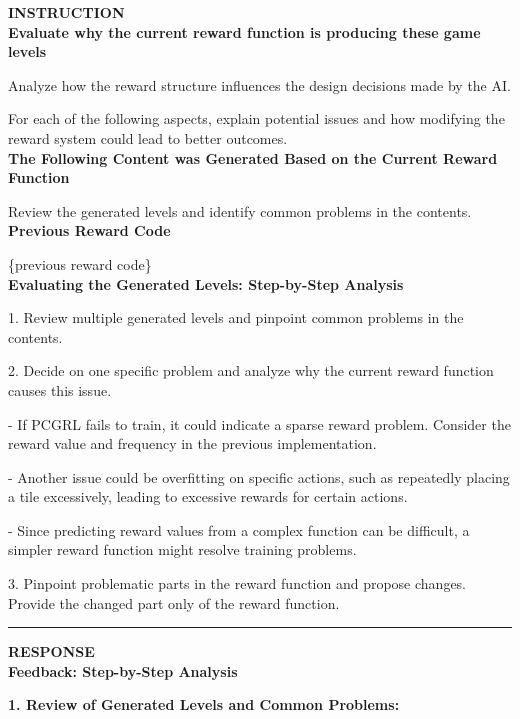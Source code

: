 \begin{tcolorbox}[colback=white, colframe=gray, title=Feedback, breakable]
{\textbf{\MakeUppercase{Instruction}}}  \\

\textbf{Evaluate why the current reward function is producing these game levels}

Analyze how the reward structure influences the design decisions made by the AI.

For each of the following aspects, explain potential issues and how modifying the reward system could lead to better outcomes. \\

\textbf{The Following Content was Generated Based on the Current Reward Function}

Review the generated levels and identify common problems in the contents.\\

\textbf{Previous Reward Code}

\{previous reward code\} \\

\textbf{Evaluating the Generated Levels: Step-by-Step Analysis}

1. Review multiple generated levels and pinpoint common problems in the contents.

2. Decide on one specific problem and analyze why the current reward function causes this issue.

- If PCGRL fails to train, it could indicate a sparse reward problem. Consider the reward value and frequency in the previous implementation.

- Another issue could be overfitting on specific actions, such as repeatedly placing a tile excessively, leading to excessive rewards for certain actions.

- Since predicting reward values from a complex function can be difficult, a simpler reward function might resolve training problems.

3. Pinpoint problematic parts in the reward function and propose changes. Provide the changed part only of the reward function.

\medskip
\noindent\textcolor{gray}{\rule{\linewidth}{0.4pt}}

{\textbf{\MakeUppercase{Response}}}  \\

\textbf{Feedback: Step-by-Step Analysis}

\textbf{1. Review of Generated Levels and Common Problems:}


\end{tcolorbox}
